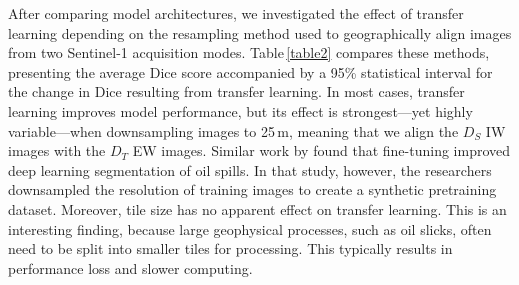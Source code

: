 \documentclass[lettersize,journal]{IEEEtran}
\begin{document}
After comparing model architectures, we investigated the effect of transfer learning depending on the resampling method used to geographically align images from two Sentinel-1 acquisition modes. Table\,\ref{table2} 
compares these methods, presenting the average Dice score accompanied by a 95\% statistical interval for the change in Dice resulting from transfer learning. In most cases, transfer learning improves model performance, 
but its effect is strongest—yet highly variable—when downsampling images to 25\,m, meaning that we align the $\mathit{D}_S$ IW images with the $\mathit{D}_T$ EW images. Similar work by 
\cite{bianchiLargeScaleDetectionCategorization2020a} found that fine-tuning improved deep learning segmentation of oil spills. In that study, however, the researchers downsampled the resolution of training images to create a 
synthetic pretraining dataset.
Moreover, tile size has no apparent effect on transfer learning. This is an interesting finding, because large geophysical processes, such as oil slicks, often need to be split into smaller tiles for processing. This 
typically results in performance loss and slower computing.
\end{document}
